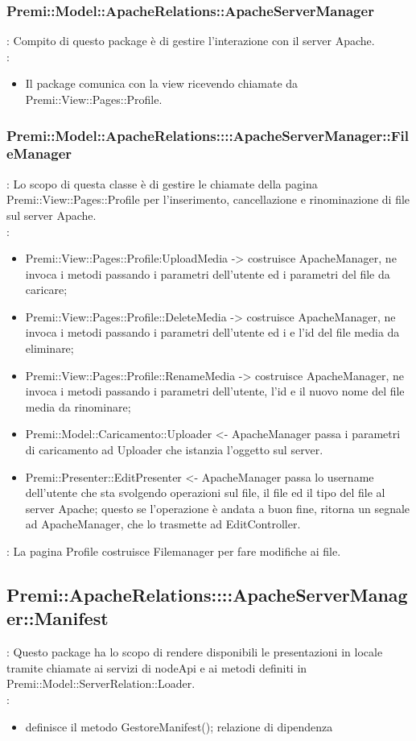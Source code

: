 \subsubsection{Premi::Model::ApacheRelations::ApacheServerManager}{
		\textbf{\tipo}: Compito di questo package è di gestire l'interazione con il server Apache.\\
		\textbf{\relaz}:
		\begin{itemize}
			\item Il package comunica con la view ricevendo chiamate da Premi::View::Pages::Profile.
		\end{itemize}

			\subsubsection{Premi::Model::ApacheRelations::::ApacheServerManager::FileManager}{
			\textbf{\tipo}: Lo scopo di questa classe è di gestire le chiamate della pagina Premi::View::Pages::Profile per l'inserimento, cancellazione e rinominazione di file sul server Apache.\\
			\textbf{\relaz}:
			\begin{itemize}
			 	\item Premi::View::Pages::Profile:UploadMedia -> costruisce ApacheManager, ne invoca i metodi passando i parametri dell'utente ed i parametri del file da caricare; 
			 	\item Premi::View::Pages::Profile::DeleteMedia -> costruisce ApacheManager, ne invoca i metodi passando i parametri dell'utente ed i e l'id del file media da eliminare;
			 	\item Premi::View::Pages::Profile::RenameMedia -> costruisce ApacheManager, ne invoca i metodi passando i parametri dell'utente, l'id e il nuovo nome del file media da rinominare; 
			 	\item Premi::Model::Caricamento::Uploader <- ApacheManager passa i parametri di caricamento ad Uploader che istanzia l'oggetto sul server.
			 	\item Premi::Presenter::EditPresenter <- ApacheManager passa lo username dell'utente che sta svolgendo operazioni sul file, il file ed il tipo del file al server Apache; questo se l'operazione è andata a buon fine, ritorna un segnale ad ApacheManager, che lo trasmette ad EditController.
			\end{itemize}
			\textbf{\interfacce}: La pagina Profile costruisce Filemanager per fare modifiche ai file. 
			
			\subsection{Premi::ApacheRelations::::ApacheServerManager::Manifest}{
			   	\textbf{\tipo}: Questo package ha lo scopo di rendere disponibili le presentazioni in locale tramite chiamate ai servizi di nodeApi e ai metodi definiti in Premi::Model::ServerRelation::Loader. \\
			   	\textbf{\relaz}:
			   	\begin{itemize}
			   		\item definisce il metodo GestoreManifest(); relazione di dipendenza 
			   	\end{itemize}
			
}}}
